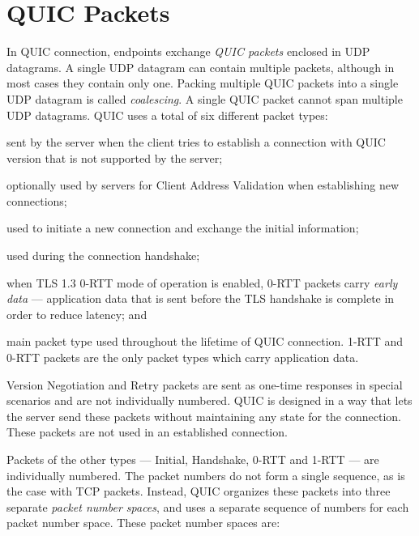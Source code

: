 \section{QUIC Packets}

In QUIC connection, endpoints exchange \textit{QUIC packets} enclosed in UDP datagrams. A single UDP
datagram can contain multiple packets, although in most cases they contain only one. Packing
multiple QUIC packets into a single UDP datagram is called \textit{coalescing}. A single QUIC packet
cannot span multiple UDP datagrams. QUIC uses a total of six different packet types:


\begin{enumerate}

   sent by the server when the client tries to establish a connection
  with QUIC version that is not supported by the server;

   optionally used by servers for Client Address Validation  when establishing new connections;

   used to initiate a new connection and exchange the initial information;

   used during the connection handshake;

   when TLS 1.3 0-RTT mode of operation is enabled, 0-RTT packets carry \textit{early
  data} --- application data that is sent before the TLS handshake is complete in order to reduce
  latency; and

   main packet type used throughout the lifetime of QUIC connection. 1-RTT and 0-RTT
  packets are the only packet types which carry application data.

\end{enumerate}

Version Negotiation and Retry packets are sent as one-time responses in special scenarios and are
not individually numbered. QUIC is designed in a way that lets the server send these packets without
maintaining any state for the connection. These packets are not used in an established connection.

Packets of the other types --- Initial, Handshake, 0-RTT and 1-RTT --- are individually numbered. The
packet numbers do not form a single sequence, as is the case with TCP packets. Instead, QUIC
organizes these packets into three separate \textit{packet number spaces}, and uses a separate
sequence of numbers for each packet number space. These packet number spaces are:

